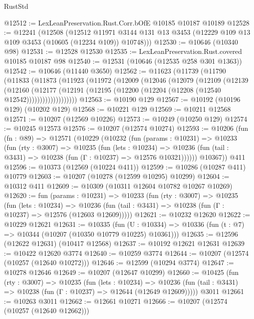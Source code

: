 \begin{lexlean}{RustStd}
\begin{coremodule}
@12512 := LexLeanPreservation.Rust.Corr.bOfE @10185 @10187 @10189
@12528 := @12241
    (@12508
      (@12512
        @11971
        @3144
        @131
        @13
        @3453
        (@12229 @109 @13 @109 @3453 (@10605 (@12234 @109)) @10748)))
@12530 := @10646 (@10340 @98)
@12531 := @12528 @12530
@12535 := LexLeanPreservation.Rust.covered @10185 @10187 @98
@12540 := @12531 (@10646 (@12535 @258 @301 @1363))
@12542 := @10646 (@11440 @3650)
@12562 := @11623
    (@11739
      (@11790
        (@11833
          (@11873
            (@11923
              (@11972
                (@12009
                  (@12046
                    (@12079
                      (@12109
                        (@12139
                          (@12160
                            (@12177
                              (@12191
                                (@12195 (@12200 (@12204 (@12208 (@12540 @12542)))))))))))))))))))
@12563 := @10190 @129
@12567 := @10192 (@10196 @129) (@10202 @129)
@12568 := @10221 @129
@12569 := @10211 @12568
@12571 := @10207 (@12569 @10226)
@12573 := @10249 (@10250 @129)
@12574 := @10245 @12573
@12576 := @10207 (@12574 @10274)
@12593 := @10206
    (fun (fn : @89) =>
    @12571
      (@10229
        (@10232
          (fun (params : @10231) =>
          @10233
            (fun (rty : @3007) =>
            @10235
              (fun (lets : @10234) =>
              @10236 (fun (tail : @3431) => @10238 (fun (Γ : @10237) => @12576 @10321))))))
        @10367))
    @411
@12596 := @10373 (@12569 (@10224 @411))
@12599 := @10286 (@10287 @411) @10779
@12603 := @10207 (@10278 (@12599 @10295) @10299)
@12604 := @10312 @411
@12609 := @10309 (@10311 @12604 @10782 @10267 @10269)
@12620 := fun (params : @10231) =>
  @10233
    (fun (rty : @3007) =>
    @10235
      (fun (lets : @10234) =>
      @10236 (fun (tail : @3431) => @10238 (fun (Γ : @10237) => @12576 (@12603 @12609)))))
@12621 := @10232 @12620
@12622 := @10229 @12621
@12631 := @10335
    (fun (U : @10334) => @10336 (fun (t : @7) => @10344 (@10207 (@10350 @10779 @10225) @10361)))
@12635 := @12596 (@12622 @12631) (@10417 @12568)
@12637 := @10192 @12621 @12631
@12639 := @10422 @12620 @3774
@12640 := @10259 @3774
@12644 := @10207 (@12574 (@10257 (@12640 @10272)))
@12646 := @12599 (@10294 @3774)
@12647 := @10278 @12646
@12649 := @10207 (@12647 @10299)
@12660 := @10425
    (fun (rty : @3007) =>
    @10235
      (fun (lets : @10234) =>
      @10236 (fun (tail : @3431) => @10238 (fun (Γ : @10237) => @12644 (@12649 @12609)))))
    @3011
@12661 := @10263 @3011
@12662 := @12661 @10271
@12666 := @10207 (@12574 (@10257 (@12640 @12662)))

\end{coremodule}
\end{lexlean}
